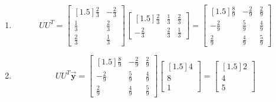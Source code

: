\documentclass[letter,11pt]{article}
\theoremstyle{definition}
\begin{document}
\begin{tcolorbox}[boxrule=1mm,before=\hfill,after=\hfill,adjusted title={Problem 4 solutions}]
\begin{enumerate}[label=\roman*.]
\begin{enumerate}[label = (\alph*.)]
            \item $$UU^{T} = \begin{bmatrix}[1.5] \frac{2}{3} & -\frac{2}{3}\\ \frac{1}{3} & \frac{2}{3}\\ \frac{2}{3} & \frac{1}{3}\end{bmatrix}\begin{bmatrix}[1.5] \frac{2}{3} & \frac{1}{3} & \frac{2}{3}\\-\frac{2}{3} & \frac{2}{3} & \frac{1}{3}  \end{bmatrix} = \begin{bmatrix}[1.5] \frac{8}{9} & -\frac{2}{9} & \frac{2}{9}\\ -\frac{2}{9} & \frac{5}{9} & \frac{4}{9} \\ \frac{2}{9} & \frac{4}{9} & \frac{5}{9}\end{bmatrix}$$
            \item $$UU^{T}\vec{\boldsymbol{y}} = \begin{bmatrix}[1.5] \frac{8}{9} & -\frac{2}{9} & \frac{2}{9}\\ -\frac{2}{9} & \frac{5}{9} & \frac{4}{9} \\ \frac{2}{9} & \frac{4}{9} & \frac{5}{9}\end{bmatrix} \begin{bmatrix}[1.5] 4 \\ 8 \\ 1 \end{bmatrix} = \begin{bmatrix}[1.5] 2 \\ 4 \\ 5 \end{bmatrix}$$
        \end{enumerate}
    
\end{enumerate}
    
\end{tcolorbox}
\end{document}
